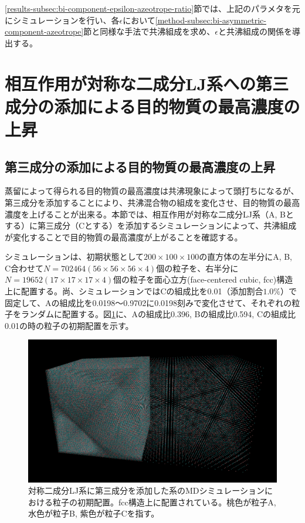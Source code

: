 \documentclass[titlepage]{jsreport}
\begin{document}
\newpage
\ref{results-subsec:bi-component-epsilon-azeotrope-ratio}節では、上記のパラメタを元にシミュレーションを行い、各$\epsilon$において\ref{method-subsec:bi-asymmetric-component-azeotrope}節と同様な手法で共沸組成を求め、$\epsilon$と共沸組成の関係を導出する。


\section{相互作用が対称な二成分LJ系への第三成分の添加による目的物質の最高濃度の上昇} \label{method-sec:bi-component-addition-of-3rd-component-highest-purity}
\subsection{第三成分の添加による目的物質の最高濃度の上昇} \label{method-subsec:bi-component-addition-of-3rd-component-highest-purity}
蒸留によって得られる目的物質の最高濃度は共沸現象によって頭打ちになるが、第三成分を添加することにより、共沸混合物の組成を変化させ、目的物質の最高濃度を上げることが出来る\cite{azeotrope-add_third_component}。本節では、相互作用が対称な二成分LJ系（A, Bとする）に第三成分（Cとする）を添加するシミュレーションによって、共沸組成が変化することで目的物質の最高濃度が上がることを確認する。

シミュレーションは、初期状態として$200×100×100$の直方体の左半分にA, B, C合わせて$N=702464(56×56×56×4)$個の粒子を、右半分に$N=19652(17×17×17×4)$個の粒子を面心立方(face-centered cubic, fcc)構造上に配置する。尚、シミュレーションではCの組成比を0.01（添加割合$1.0\%$）で固定して、Aの組成比を0.0198〜0.9702に0.0198刻みで変化させて、それぞれの粒子をランダムに配置する。図\ref{fig:lan278176-lbn417263-lcn7025-ran7782-rbn11673-rcn197-first}に、Aの組成比0.396, Bの組成比0.594, Cの組成比0.01の時の粒子の初期配置を示す。

\begin{figure}[htbp]
    \begin{center}
        \includegraphics[width=14cm]{fig/lan278176-lbn417263-lcn7025-ran7782-rbn11673-rcn197/lan278176-lbn417263-lcn7025-ran7782-rbn11673-rcn197-first.png}
    \end{center}
    \caption{対称二成分LJ系に第三成分を添加した系のMDシミュレーションにおける粒子の初期配置。fcc構造上に配置されている。桃色が粒子A, 水色が粒子B, 紫色が粒子Cを指す。}
    \label{fig:lan278176-lbn417263-lcn7025-ran7782-rbn11673-rcn197-first}
\end{figure}
\end{document}
